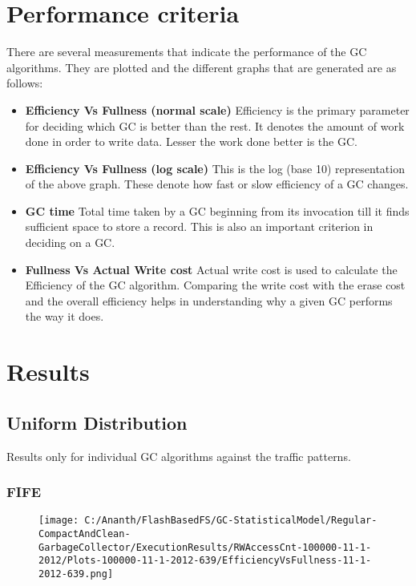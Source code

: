 \section{Performance criteria}
	There are several measurements that indicate the performance of the GC algorithms. They are plotted and the different graphs that are generated are as follows:
\begin{itemize}
\item {\bf Efficiency Vs Fullness (normal scale)}
\subitem Efficiency is the primary parameter for deciding which GC is better than the rest. It denotes the amount of work done in order to write data. Lesser the work done better is the GC.
\item {\bf Efficiency Vs Fullness (log scale)}
\subitem This is the log (base 10) representation of the above graph. These denote how fast or slow efficiency of a GC changes. 
\item {\bf GC time}
\subitem Total time taken by a GC beginning from its invocation till it finds sufficient space to store a record. This is also an important criterion in deciding on a GC.
\item {\bf Fullness Vs Actual Write cost}
\subitem Actual write cost is used to calculate the Efficiency of the GC algorithm. Comparing the write cost with the erase cost and the overall efficiency helps in understanding why a given GC performs the way it does.
\end{itemize}

\section{Results}

\subsection{Uniform Distribution}
	Results only for individual GC algorithms against the traffic patterns.

\subsubsection{FIFE}

\begin{figure}[!ht]
	\centering
	\texttt{[image: C:/Ananth/FlashBasedFS/GC-StatisticalModel/Regular-CompactAndClean-GarbageCollector/ExecutionResults/RWAccessCnt-100000-11-1-2012/Plots-100000-11-1-2012-639/EfficiencyVsFullness-11-1-2012-639.png]}
\end{figure}

